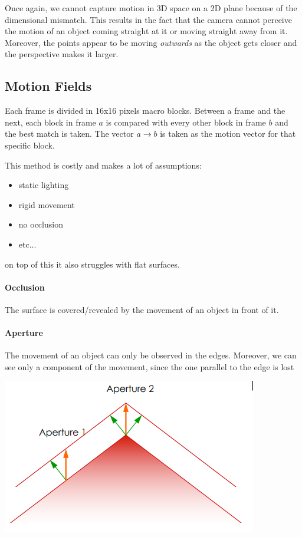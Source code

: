 \documentclass{article}
\begin{document}
Once again, we cannot capture motion in 3D space on a 2D plane because of the dimensional mismatch. This results in the fact that the camera cannot perceive the motion of an object coming straight at it or moving straight away from it.\\
Moreover, the points appear to be moving \textit{outwards} as the object gets closer and the perspective makes it larger.

\subsection{Motion Fields}
Each frame is divided in 16x16 pixels macro blocks. Between a frame and the next, each block in frame $a$ is compared with every other block in frame $b$ and the best match is taken. The vector $a\to b$ is taken as the motion vector for that specific block.

This method is costly and makes a lot of assumptions:
\begin{itemize}
    \item static lighting
    \item rigid movement
    \item no occlusion
    \item etc...
\end{itemize}
on top of this it also struggles with flat surfaces.

\paragraph{Occlusion} The surface is covered/revealed by the movement of an object in front of it.

\paragraph{Aperture} The movement of an object can only be observed in the edges. Moreover, we can see only a component of the movement, since the one parallel to the edge is lost
\begin{center}
    \includegraphics[width=0.9\linewidth]{images/aperture.png}
\end{center}
\end{document}

